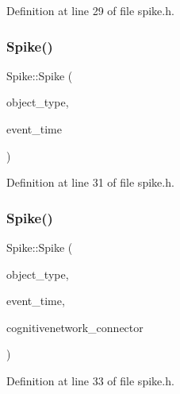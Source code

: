 Definition at line 29 of file spike.\+h.

\mbox{\label{class_spike_a9368fb7b20887e5f02f3de6176f04c02}} 
\subsubsection{\texorpdfstring{Spike()}{Spike()}\hspace{0.1cm}{\footnotesize\ttfamily [3/4]}}
{\footnotesize\ttfamily Spike\+::\+Spike (\begin{DoxyParamCaption}\item[{unsigned int}]{object\+\_\+type,  }\item[{std\+::chrono\+::time\+\_\+point$<$ \mbox{\hyperlink{universe_8h_a0ef8d951d1ca5ab3cfaf7ab4c7a6fd80}{Clock}} $>$}]{event\+\_\+time }\end{DoxyParamCaption})\hspace{0.3cm}{\ttfamily [inline]}}



Definition at line 31 of file spike.\+h.

\mbox{\label{class_spike_afecf811f48103b529016a73349b50fe4}} 
\subsubsection{\texorpdfstring{Spike()}{Spike()}\hspace{0.1cm}{\footnotesize\ttfamily [4/4]}}
{\footnotesize\ttfamily Spike\+::\+Spike (\begin{DoxyParamCaption}\item[{unsigned int}]{object\+\_\+type,  }\item[{std\+::chrono\+::time\+\_\+point$<$ \mbox{\hyperlink{universe_8h_a0ef8d951d1ca5ab3cfaf7ab4c7a6fd80}{Clock}} $>$}]{event\+\_\+time,  }\item[{\mbox{\hyperlink{class_cognitive_network}{Cognitive\+Network}} \&}]{cognitivenetwork\+\_\+connector }\end{DoxyParamCaption})\hspace{0.3cm}{\ttfamily [inline]}}



Definition at line 33 of file spike.\+h.

